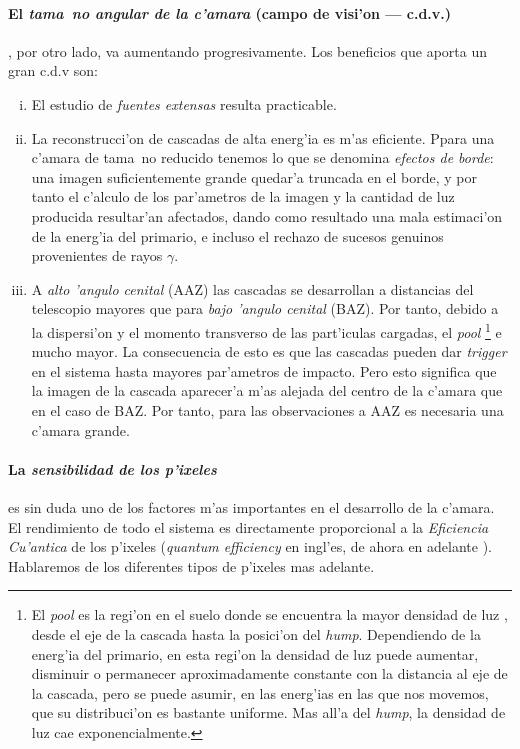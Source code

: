 \paragraph{El \emph{tama~no angular de la c'amara} (campo de visi'on 
--- c.d.v.)}, por otro lado, va aumentando progresivamente. Los
beneficios que aporta un gran c.d.v son:
%
\begin{enumerate}[i)]
\item El estudio de \emph{fuentes extensas} resulta practicable.
%
\item La reconstrucci'on de cascadas de alta energ'ia es m'as
eficiente. Ppara una c'amara de tama~no reducido tenemos lo que se
denomina \emph{efectos de borde}: una imagen suficientemente grande
quedar'a truncada en el borde, y por tanto el c'alculo de los
par'ametros de la imagen y la cantidad de luz producida resultar'an
afectados, dando como resultado una mala estimaci'on de la energ'ia
del primario, e incluso el rechazo de sucesos genuinos provenientes de
rayos $\gamma$.
%
\item A \emph{alto 'angulo cenital} (AAZ) las cascadas se desarrollan
a distancias del telescopio mayores que para \emph{bajo 'angulo
cenital} (BAZ). Por tanto, debido a la dispersi'on y el momento
transverso de las part'iculas cargadas, el \emph{pool}
\Cherenkov\footnote{El \emph{pool} \Cherenkov es la regi'on en el
suelo donde se encuentra la mayor densidad de luz \Cherenkov, desde el
eje de la cascada hasta la posici'on del \emph{hump}. Dependiendo de
la energ'ia del primario, en esta regi'on la densidad de luz puede
aumentar, disminuir o permanecer aproximadamente constante con la
distancia al eje de la cascada, pero se puede asumir, en las energ'ias
en las que nos movemos, que su distribuci'on es bastante uniforme. Mas
all'a del \emph{hump}, la densidad de luz cae exponencialmente.} e
mucho mayor. La consecuencia de esto es que las cascadas pueden dar
\emph{trigger} en el sistema hasta mayores par'ametros de
impacto. Pero esto significa que la imagen de la cascada aparecer'a
m'as alejada del centro de la c'amara que en el caso de BAZ. Por
tanto, para las observaciones a AAZ es necesaria una c'amara grande.
\end{enumerate}

\paragraph{La \emph{sensibilidad de los p'ixeles}} es sin duda uno de
los factores m'as importantes en el desarrollo de la c'amara. El
rendimiento de todo el sistema es directamente proporcional a la
\emph{Eficiencia Cu'antica} de los p'ixeles (\emph{quantum efficiency} 
en ingl'es, de ahora en adelante \QE). Hablaremos de los diferentes
tipos de p'ixeles mas adelante.

